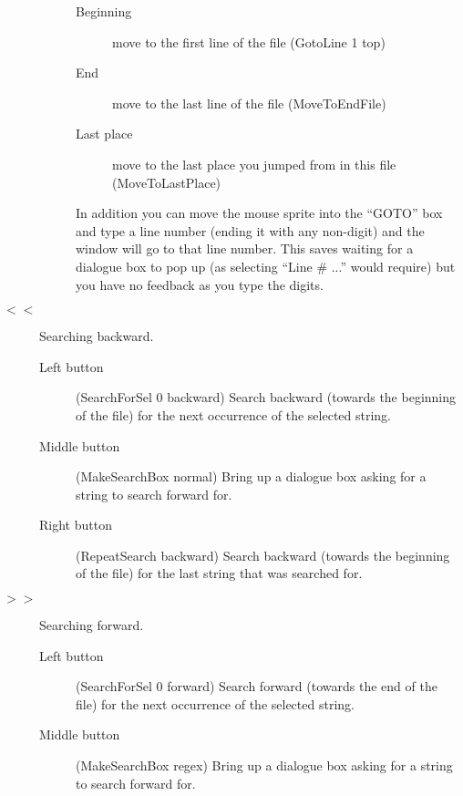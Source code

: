 \begin{description}
\begin{description}
\begin{description}
		\item[Beginning] move to the first line of the file
			(GotoLine 1 top)

		\item[End] move to the last line of the file (MoveToEndFile)

		\item[Last place] move to the last place you jumped
			from in this file (MoveToLastPlace)

	\end{description}

	In addition you can move the mouse sprite into the ``GOTO'' box and
	type a line number (ending it with any non-digit) and the
	window will go to that line number.
	This saves waiting for a dialogue box to pop up
	(as selecting ``Line \# ...'' would require) but you have no
	feedback as you type the digits.

	\end{description}

\item[$<<$] Searching backward.

	\begin{description}

	\item[Left button] (SearchForSel 0 backward)
		Search backward (towards the beginning of the file)
		for the next occurrence of the selected string.

	\item[Middle button] (MakeSearchBox normal) Bring up a dialogue box
		asking for a string to search forward for.

	\item[Right button] (RepeatSearch backward)
		Search backward (towards the beginning of the file)
		for the last string that was searched for.

	\end{description}

\item[$>>$]  Searching forward.

	\begin{description}

	\item[Left button] (SearchForSel 0 forward)
		Search forward (towards	the end of the file) for
		the next occurrence of the selected string.

	\item[Middle button] (MakeSearchBox regex) Bring up a dialogue box
		asking for a string to search forward for.


\end{description}
\end{description}
